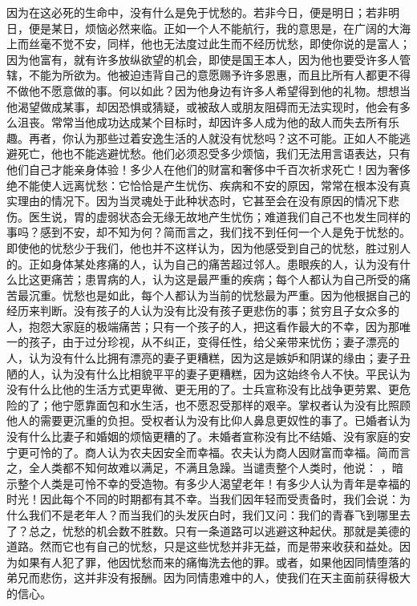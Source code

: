因为在这必死的生命中，没有什么是免于忧愁的。若非今日，便是明日；若非明日，便是某日，烦恼必然来临。正如一个人不能航行，我的意思是，在广阔的大海上而丝毫不觉不安，同样，他也无法度过此生而不经历忧愁，即使你说的是富人；因为他富有，就有许多放纵欲望的机会，即使是国王本人，因为他也要受许多人管辖，不能为所欲为。他被迫违背自己的意愿赐予许多恩惠，而且比所有人都更不得不做他不愿意做的事。何以如此？因为他身边有许多人希望得到他的礼物。想想当他渴望做成某事，却因恐惧或猜疑，或被敌人或朋友阻碍而无法实现时，他会有多么沮丧。常常当他成功达成某个目标时，却因许多人成为他的敌人而失去所有乐趣。再者，你认为那些过着安逸生活的人就没有忧愁吗？这不可能。正如人不能逃避死亡，他也不能逃避忧愁。他们必须忍受多少烦恼，我们无法用言语表达，只有他们自己才能亲身体验！多少人在他们的财富和奢侈中千百次祈求死亡！因为奢侈绝不能使人远离忧愁：它恰恰是产生忧伤、疾病和不安的原因，常常在根本没有真实理由的情况下。因为当灵魂处于此种状态时，它甚至会在没有原因的情况下悲伤。医生说，胃的虚弱状态会无缘无故地产生忧伤；难道我们自己不也发生同样的事吗？感到不安，却不知为何？简而言之，我们找不到任何一个人是免于忧愁的。即使他的忧愁少于我们，他也并不这样认为，因为他感受到自己的忧愁，胜过别人的。正如身体某处疼痛的人，认为自己的痛苦超过邻人。患眼疾的人，认为没有什么比这更痛苦；患胃病的人，认为这是最严重的疾病；每个人都认为自己所受的痛苦最沉重。忧愁也是如此，每个人都认为当前的忧愁最为严重。因为他根据自己的经历来判断。没有孩子的人认为没有比没有孩子更悲伤的事；贫穷且子女众多的人，抱怨大家庭的极端痛苦；只有一个孩子的人，把这看作最大的不幸，因为那唯一的孩子，由于过分珍视，从不纠正，变得任性，给父亲带来忧伤；妻子漂亮的人，认为没有什么比拥有漂亮的妻子更糟糕，因为这是嫉妒和阴谋的缘由；妻子丑陋的人，认为没有什么比相貌平平的妻子更糟糕，因为这始终令人不快。平民认为没有什么比他的生活方式更卑微、更无用的了。士兵宣称没有比战争更劳累、更危险的了；他宁愿靠面包和水生活，也不愿忍受那样的艰辛。掌权者认为没有比照顾他人的需要更沉重的负担。受权者认为没有比仰人鼻息更奴性的事了。已婚者认为没有什么比妻子和婚姻的烦恼更糟的了。未婚者宣称没有比不结婚、没有家庭的安宁更可怜的了。商人认为农夫因安全而幸福。农夫认为商人因财富而幸福。简而言之，全人类都不知何故难以满足，不满且急躁。当谴责整个人类时，他说： ，暗示整个人类是可怜不幸的受造物。有多少人渴望老年！有多少人认为青年是幸福的时光！因此每个不同的时期都有其不幸。当我们因年轻而受责备时，我们会说：为什么我们不是老年人？而当我们的头发灰白时，我们又问：我们的青春飞到哪里去了？总之，忧愁的机会数不胜数。只有一条道路可以逃避这种起伏。那就是美德的道路。然而它也有自己的忧愁，只是这些忧愁并非无益，而是带来收获和益处。因为如果有人犯了罪，他因忧愁而来的痛悔洗去他的罪。或者，如果他因同情堕落的弟兄而悲伤，这并非没有报酬。因为同情患难中的人，使我们在天主面前获得极大的信心。\par

